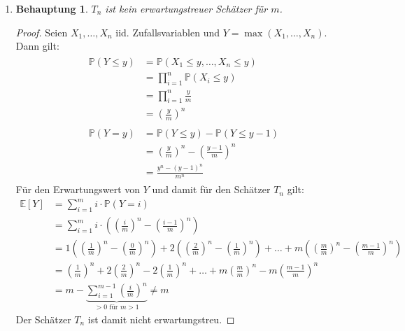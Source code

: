 \documentclass[a4paper]{scrartcl}
\newtheorem*{behaupt}{Behauptung}
\newcommand{\prob}{\mathbb{P}}
\newcommand{\e}{\mathbb{E}}
\def \blattnr {7}
\begin{document}
\begin{enumerate}[label=\bfseries \blattnr.\arabic*]
\begin{enumerate}
        \item 
            \begin{behaupt}
                $T_n$ ist kein erwartungstreuer Schätzer für $m$.
            \end{behaupt}
            \begin{proof}
                Seien $X_1, \dotsc, X_n$ iid. Zufallsvariablen und $Y = \max(X_1,
                \dotsc, X_n)$. Dann gilt:
                \begin{align*}
                    \begin{split}
                            \prob(Y \leq y)
                            &= \prob(X_1 \leq y, \dotsc, X_n \leq y) \\
                            &= \prod_{i=1}^n \prob(X_i \leq y) \\
                            &= \prod_{i=1}^n \frac{y}{m} \\
                            &= \left(\frac{y}{m}\right)^n
                    \end{split} \\
                    \begin{split}
                            \prob(Y = y)
                            &= \prob(Y \leq y) - \prob(Y \leq y-1) \\
                            &= \left(\frac{y}{m}\right)^n - \left(\frac{y-1}{m}\right)^n \\
                            &= \frac{y^n - (y-1)^n}{m^n}
                    \end{split}
                \end{align*}
                Für den Erwartungswert von $Y$ und damit für den Schätzer $T_n$
                gilt:
                \begin{equation*}
                    \begin{split}
                        \e[Y] &= \sum_{i=1}^m i \cdot \prob(Y = i) \\
                              &= \sum_{i=1}^m i \cdot \left(\left(\frac{i}{m}\right)^n - \left(\frac{i-1}{m}\right)^n \right) \\
                              &= 1 \left(\left(\frac{1}{m}\right)^n - \left(\frac{0}{m}\right)^n \right) + 2 \left(\left(\frac{2}{m}\right)^n - \left(\frac{1}{m}\right)^n \right) + \dotsc + m \left(\left(\frac{m}{m}\right)^n - \left(\frac{m-1}{m}\right)^n \right)  \\
                              &= \left(\frac{1}{m}\right)^n + 2\left(\frac{2}{m}\right)^n -2\left(\frac{1}{m}\right)^n + \dotsc + m\left(\frac{m}{m}\right)^n -m\left(\frac{m-1}{m}\right)^n \\
                              &= m - \underbrace{\sum_{i=1}^{m-1} \left(\frac{i}{m}\right)^n}_{> 0 \text{ für } m > 1}
                              \neq m
                    \end{split}
                \end{equation*}
                Der Schätzer $T_n$ ist damit nicht erwartungstreu.
            \end{proof}
    \end{enumerate}


\end{enumerate}
\end{document}
